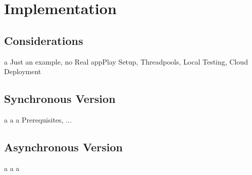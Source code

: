 \chapter{Implementation}

\section{Considerations} \newpage a 
Just an example, no Real appPlay Setup, Threadpools, Local Testing, Cloud Deployment

\section{Synchronous Version} \newpage a \newpage a \newpage a 
Prerequisites, ...

\section{Asynchronous Version} \newpage a \newpage a \newpage a 